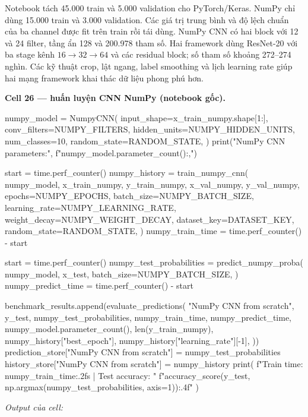 \documentclass[12pt,a4paper]{report}
\begin{document}
Notebook tách 45.000 train và 5.000 validation cho PyTorch/Keras. NumPy chỉ dùng 15.000 train và 3.000 validation. Các giá trị trung bình và độ lệch chuẩn của ba channel được fit trên train rồi tái dùng. NumPy CNN có hai block với 12 và 24 filter, tầng ẩn 128 và 200.978 tham số. Hai framework dùng ResNet-20 với ba stage kênh $16\to32\to64$ và các residual block; số tham số khoảng 272--274 nghìn. Các kỹ thuật crop, lật ngang, label smoothing và lịch learning rate giúp hai mạng framework khai thác dữ liệu phong phú hơn.

\par\medskip\noindent\textbf{Cell 26 --- huấn luyện CNN NumPy (notebook gốc).}
\begin{NotebookCode}
numpy_model = NumpyCNN(
    input_shape=x_train_numpy.shape[1:],
    conv_filters=NUMPY_FILTERS,
    hidden_units=NUMPY_HIDDEN_UNITS,
    num_classes=10,
    random_state=RANDOM_STATE,
)
print("NumPy CNN parameters:", f"{numpy_model.parameter_count():,}")

start = time.perf_counter()
numpy_history = train_numpy_cnn(
    numpy_model,
    x_train_numpy,
    y_train_numpy,
    x_val_numpy,
    y_val_numpy,
    epochs=NUMPY_EPOCHS,
    batch_size=NUMPY_BATCH_SIZE,
    learning_rate=NUMPY_LEARNING_RATE,
    weight_decay=NUMPY_WEIGHT_DECAY,
    dataset_key=DATASET_KEY,
    random_state=RANDOM_STATE,
)
numpy_train_time = time.perf_counter() - start

start = time.perf_counter()
numpy_test_probabilities = predict_numpy_proba(
    numpy_model,
    x_test,
    batch_size=NUMPY_BATCH_SIZE,
)
numpy_predict_time = time.perf_counter() - start

benchmark_results.append(evaluate_predictions(
    "NumPy CNN from scratch",
    y_test,
    numpy_test_probabilities,
    numpy_train_time,
    numpy_predict_time,
    numpy_model.parameter_count(),
    len(y_train_numpy),
    numpy_history["best_epoch"],
    numpy_history["learning_rate"][-1],
))
prediction_store["NumPy CNN from scratch"] = numpy_test_probabilities
history_store["NumPy CNN from scratch"] = numpy_history
print(
    f"Train time: {numpy_train_time:.2f}s | Test accuracy: "
    f"{accuracy_score(y_test, np.argmax(numpy_test_probabilities, axis=1)):.4f}"
)
\end{NotebookCode}
\noindent\textit{Output của cell:}
\end{document}
